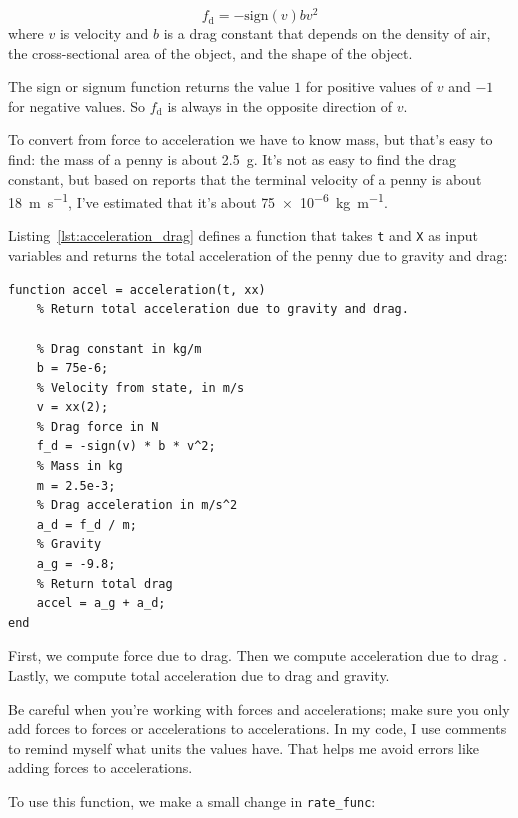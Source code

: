 \begin{equation*}
    f_\mathrm{d} = -\mathrm{sign}(v) b v^2
\end{equation*}
where $v$ is velocity and
$b$ is a drag constant that depends on the density of
air, the cross-sectional area of the object, and the shape
of the object.

The sign or signum function returns the value $1$ for positive values of
$v$ and $-1$ for negative values.  So $f_\mathrm{d}$ is always in the opposite direction of $v$.


To convert from force to acceleration we have to know mass, but that's easy to find: the mass of a penny is about \SI{2.5}{\gram}.  It's not as easy to find the drag constant, but based on reports that the terminal velocity of a penny is about \SI{18}{\meter \per \second}, I've estimated that it's about \SI{75e-6}{\kilogram \per \meter}.

Listing~\ref{lst:acceleration_drag} defines a function that takes \lstinline{t} and \lstinline{X} as input variables and returns the total acceleration of the penny due to gravity and drag:

\begin{lstlisting}[caption={Calculating acceleration of a penny with drag}, label={lst:acceleration_drag}]
function accel = acceleration(t, xx)
    % Return total acceleration due to gravity and drag.
    
    % Drag constant in kg/m
    b = 75e-6; 
    % Velocity from state, in m/s
    v = xx(2);
    % Drag force in N    
    f_d = -sign(v) * b * v^2;
    % Mass in kg
    m = 2.5e-3;
    % Drag acceleration in m/s^2
    a_d = f_d / m;
    % Gravity
    a_g = -9.8;
    % Return total drag
    accel = a_g + a_d;
end
\end{lstlisting}

First, we compute force due to drag. Then we compute acceleration due to drag .
Lastly, we compute total acceleration due to drag and gravity.


Be careful when you're working with forces and accelerations; make sure
you only add forces to forces or accelerations to accelerations.  In my
code, I use comments to remind myself what units the values have.
That helps me avoid errors like adding forces to accelerations.

To use this function, we make a small change in \lstinline{rate_func}:

